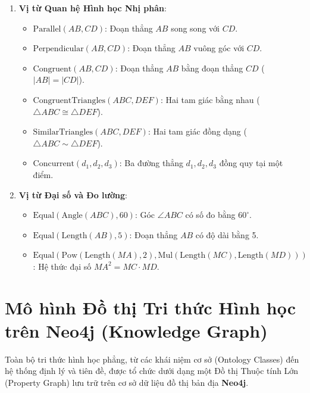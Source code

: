 \begin{enumerate}
    \item \textbf{Vị từ Quan hệ Hình học Nhị phân}:
    \begin{itemize}
        \item $\text{Parallel}(AB, CD)$: Đoạn thẳng $AB$ song song với $CD$.
        \item $\text{Perpendicular}(AB, CD)$: Đoạn thẳng $AB$ vuông góc với $CD$.
        \item $\text{Congruent}(AB, CD)$: Đoạn thẳng $AB$ bằng đoạn thẳng $CD$ ($|AB| = |CD|$).
        \item $\text{CongruentTriangles}(ABC, DEF)$: Hai tam giác bằng nhau ($\triangle ABC \cong \triangle DEF$).
        \item $\text{SimilarTriangles}(ABC, DEF)$: Hai tam giác đồng dạng ($\triangle ABC \sim \triangle DEF$).
        \item $\text{Concurrent}(d_1, d_2, d_3)$: Ba đường thẳng $d_1, d_2, d_3$ đồng quy tại một điểm.
    \end{itemize}

    \item \textbf{Vị từ Đại số và Đo lường}:
    \begin{itemize}
        \item $\text{Equal}(\text{Angle}(ABC), 60)$: Góc $\angle ABC$ có số đo bằng $60^\circ$.
        \item $\text{Equal}(\text{Length}(AB), 5)$: Đoạn thẳng $AB$ có độ dài bằng 5.
        \item $\text{Equal}(\text{Pow}(\text{Length}(MA), 2), \text{Mul}(\text{Length}(MC), \text{Length}(MD)))$: Hệ thức đại số $MA^2 = MC \cdot MD$.
    \end{itemize}
\end{enumerate}

\section{Mô hình Đồ thị Tri thức Hình học trên Neo4j (Knowledge Graph)}
Toàn bộ tri thức hình học phẳng, từ các khái niệm cơ sở (Ontology Classes) đến hệ thống định lý và tiên đề, được tổ chức dưới dạng một Đồ thị Thuộc tính Lớn (Property Graph) lưu trữ trên cơ sở dữ liệu đồ thị bản địa \textbf{Neo4j}.

